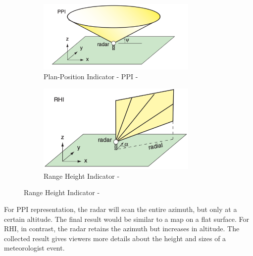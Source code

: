 \begin{figure}[htp!]
    \centering
    \begin{subfigure}{\textwidth}
        \centering
        \includegraphics[width=0.85\textwidth]{Images/2.1-ppi.png}
        \caption{Plan-Position Indicator - PPI - \cite{2022Weather}}
        \label{fig:ppi}
    \end{subfigure}

    \begin{subfigure}{\textwidth}
        \centering
        \includegraphics[width=0.85\textwidth]{Images/2.1-rhi.png}
        \caption{Range Height Indicator - \cite{2022Weather}}
        \label{fig:rhi}
    \end{subfigure}

\end{figure}

For PPI representation, the radar will scan the entire azimuth, but only at a
certain altitude. The final result would be similar to a map on a flat surface.
For RHI, in contrast, the radar retains the azimuth but increases in altitude.
The collected result gives viewers more details about the height and sizes of a
meteorologist event.

